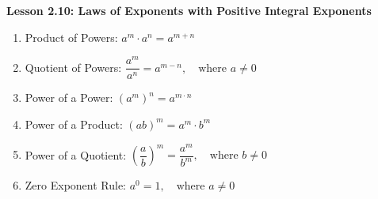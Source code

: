 \begin{center}
\textbf{Lesson 2.10: Laws of Exponents with Positive Integral Exponents}
\end{center}

\vspace*{1ex}

\begin{enumerate}[noitemsep, label = \color{blue}\arabic*. ]
    \item  Product of Powers: \( a^m \cdot a^n = a^{m+n} \)
    \item  Quotient of Powers: \( \dfrac{a^m}{a^n} = a^{m-n}, \quad \text{where } a \neq 0 \)
    \item  Power of a Power: \( (a^m)^n = a^{m \cdot n} \)
    \item  Power of a Product: \( (ab)^m = a^m \cdot b^m \)
    \item  Power of a Quotient: \( \left( \dfrac{a}{b} \right)^m = \dfrac{a^m}{b^m}, \quad \text{where } b \neq 0 \)
    \item  Zero Exponent Rule: \( a^0 = 1, \quad \text{where } a \neq 0 \)
\end{enumerate}

